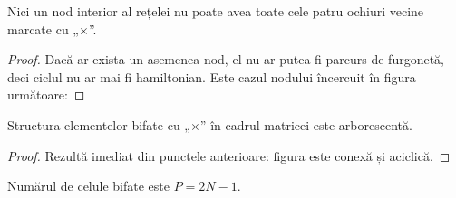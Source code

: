 \begin{property}
  Nici un nod interior al rețelei nu poate avea toate cele patru ochiuri
  vecine marcate cu „$\times$”.
\end{property}

\begin{proof}
  Dacă ar exista un asemenea nod, el nu ar putea fi parcurs de furgonetă, deci
  ciclul nu ar mai fi hamiltonian. Este cazul nodului încercuit în figura
  următoare:
\end{proof}


\begin{property}
  Structura elementelor bifate cu „$\times$” în cadrul matricei este
  arborescentă.
\end{property}

\begin{proof}
  Rezultă imediat din punctele anterioare: figura este conexă și aciclică.
\end{proof}

\begin{property}
  Numărul de celule bifate este $P = 2N - 1$.
\end{property}

